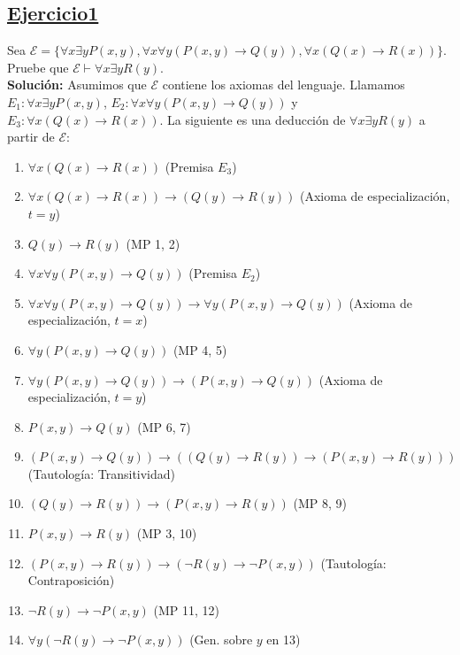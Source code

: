 \subsection*{\uline{Ejercicio1}}
Sea $\mathcal{E} = \{ \forall x \exists y P(x,y), \forall x \forall y (P(x,y) \rightarrow Q(y)), \forall x (Q(x) \rightarrow R(x)) \}$. Pruebe que $\mathcal{E} \vdash \forall x \exists y R(y)$.\\

\textbf{Solución:} Asumimos que $\mathcal{E}$ contiene los axiomas del lenguaje. Llamamos $E_1: \forall x \exists y P(x,y)$, $E_2: \forall x \forall y (P(x,y)\rightarrow Q(y))$ y $E_3: \forall x (Q(x) \rightarrow R(x))$. La siguiente es una deducción de $\forall x \exists y R(y)$ a partir de $\mathcal{E}$:

\begin{enumerate}
    \item $\forall x(Q(x) \rightarrow R(x))$ \hfill(Premisa $E_3$)
    \item $\forall x(Q(x) \rightarrow R(x)) \rightarrow (Q(y) \rightarrow R(y))$ \hfill(Axioma de especialización, $t = y$)
    \item $Q(y) \rightarrow R(y)$ \hfill(MP 1, 2)
    \item $\forall x \forall y(P(x, y) \rightarrow Q(y))$ \hfill(Premisa $E_2$)
    \item $\forall x \forall y(P(x, y) \rightarrow Q(y)) \rightarrow \forall y(P(x, y) \rightarrow Q(y))$ \hfill(Axioma de especialización, $t = x$)
    \item $\forall y(P(x, y) \rightarrow Q(y))$ \hfill(MP 4, 5)
    \item $\forall y(P(x, y) \rightarrow Q(y)) \rightarrow (P(x, y) \rightarrow Q(y))$ \hfill(Axioma de especialización, $t = y$)
    \item $P(x, y) \rightarrow Q(y)$ \hfill(MP 6, 7)
    \item $(P(x, y) \rightarrow Q(y)) \rightarrow ((Q(y) \rightarrow R(y)) \rightarrow (P(x, y) \rightarrow R(y)))$ \hfill(Tautología: Transitividad)
    \item $(Q(y) \rightarrow R(y)) \rightarrow (P(x, y) \rightarrow R(y))$ \hfill(MP 8, 9)
    \item $P(x, y) \rightarrow R(y)$ \hfill(MP 3, 10)
    \item $(P(x, y) \rightarrow R(y)) \rightarrow (\neg R(y) \rightarrow \neg P(x, y))$ \hfill(Tautología: Contraposición)
    \item $\neg R(y) \rightarrow \neg P(x, y)$ \hfill(MP 11, 12)
    \item $\forall y (\neg R(y) \rightarrow \neg P(x, y))$ \hfill(Gen. sobre $y$ en 13)
    

\end{enumerate}
